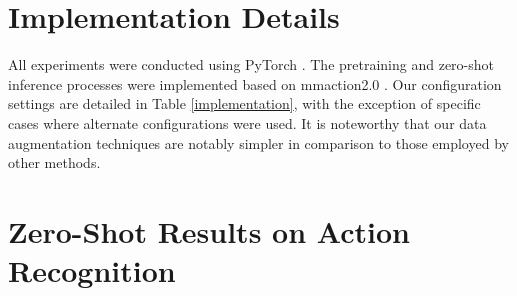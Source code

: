 \documentclass{article} \usepackage{iclr2024_conference,times}
\begin{document}
\section{Implementation Details}
All experiments were conducted using PyTorch \citep{paszke2019pytorch}. The pretraining and zero-shot inference processes were implemented based on mmaction2.0 \citep{2020mmaction2}. Our configuration settings are detailed in Table \ref{implementation}, with the exception of specific cases where alternate configurations were used. It is noteworthy that our data augmentation techniques are notably simpler in comparison to those employed by other methods.

\begin{table*}[t]
\setlength{\tabcolsep}{3pt}
\centering
\caption{Default implementation details for pretraining and instruction tuning.}
\vspace{-0.8em}
\vspace{-0.5em}
\label{implementation}
\end{table*}

\section{Zero-Shot Results on Action Recognition} \label{sec_zsaction}
\end{document}
